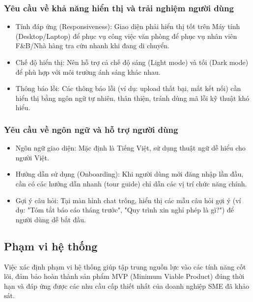 \subsubsection{Yêu cầu về khả năng hiển thị và trải nghiệm người
dùng}\label{yuxeau-cux1ea7u-vux1ec1-khux1ea3-nux103ng-hiux1ec3n-thux1ecb-vuxe0-trux1ea3i-nghiux1ec7m-ngux1b0ux1eddi-duxf9ng}

\begin{itemize}
\item
  Tính đáp ứng (Responsiveness): Giao diện phải hiển thị tốt trên Máy
  tính (Desktop/Laptop) để phục vụ công việc văn phòng để phục vụ nhân
  viên F\&B/Nhà hàng tra cứu nhanh khi đang di chuyển.
\item
  Chế độ hiển thị: Nên hỗ trợ cả chế độ sáng (Light mode) và tối (Dark
  mode) để phù hợp với môi trường ánh sáng khác nhau.
\item
  Thông báo lỗi: Các thông báo lỗi (ví dụ: upload thất bại, mất kết nối)
  cần hiển thị bằng ngôn ngữ tự nhiên, thân thiện, tránh dùng mã lỗi kỹ
  thuật khó hiểu.
\end{itemize}

\subsubsection{Yêu cầu về ngôn ngữ và hỗ trợ người
dùng}\label{yuxeau-cux1ea7u-vux1ec1-nguxf4n-ngux1eef-vuxe0-hux1ed7-trux1ee3-ngux1b0ux1eddi-duxf9ng}

\begin{itemize}
\item
  Ngôn ngữ giao diện: Mặc định là Tiếng Việt, sử dụng thuật ngữ dễ hiểu
  cho người Việt.
\item
  Hướng dẫn sử dụng (Onboarding): Khi người dùng mới đăng nhập lần đầu,
  cần có các hướng dẫn nhanh (tour guide) chỉ dẫn các vị trí chức năng
  chính.
\item
  Gợi ý câu hỏi: Tại màn hình chat trống, hiển thị các mẫu câu hỏi gợi ý
  (ví dụ: "Tóm tắt báo cáo tháng trước", "Quy trình xin nghỉ phép là
  gì?") để người dùng dễ bắt đầu.
\end{itemize}

\subsection{Phạm vi hệ thống}\label{phux1ea1m-vi-hux1ec7-thux1ed1ng}

Việc xác định phạm vi hệ thống giúp tập trung nguồn lực vào các tính
năng cốt lõi, đảm bảo hoàn thành sản phẩm MVP (Minimum Viable Product)
đúng thời hạn và đáp ứng được các nhu cầu cấp thiết nhất của doanh
nghiệp SME đã khảo sát.

